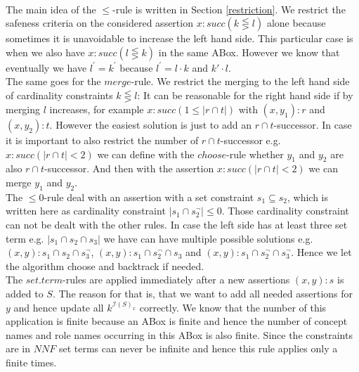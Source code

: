\documentclass[a4paper,11pt]{scrartcl}
\theoremstyle{break}
\theoremstyle{definition}
\begin{document}
\\
The main idea of the $\leq$-rule is written in Section \ref{restriction}. We restrict the safeness criteria on the considered assertion $x:succ(k\lesseqgtr l)$ alone because sometimes it is unavoidable to increase the left hand side. This particular case is when we also have $x:succ(l\lesseqgtr k)$ in the same ABox. However we know that eventually we have $l^\prime=k^\prime$ because $l^\prime=l\cdot k$ and $k\prime\cdot l$.\\
The same goes for the $merge$-rule. We restrict the merging to the left hand side of cardinality constraints $k\lesseqgtr l$: It can be reasonable for the right hand side if by merging $l$ increases, for example $x:succ(1\leq |r\cap t|)$ with $(x,y_1):r$ and $(x,y_2):t$. However the easiest solution is just to add an $r\cap t$-successor. In case it is important to also restrict the number of $r\cap t$-successor e.g. $x:succ(|r\cap t|<2)$ we can define with the $choose$-rule whether $y_1$ and $y_2$ are also $r\cap t$-successor. And then with the assertion $x:succ(|r\cap t|<2)$ we can merge $y_1$ and $y_2$.\\
The $\leq 0$-rule deal with an assertion with a set constraint $s_1\subseteq s_2$, which is written here as cardinality constraint $|s_1\cap s_2^\neg|\leq 0$. Those cardinality constraint can not be dealt with the other rules. In case the left side has at least three set term  e.g. $|s_1\cap s_2\cap s_3|$ we have can have multiple possible solutions e.g. $(x,y):s_1\cap s_2\cap s_3^\neg$, $(x,y):s_1\cap s_2^\neg\cap s_3$ and $(x,y):s_1\cap s_2^\neg\cap s_3^\neg$. Hence we let the algorithm choose and backtrack if needed.\\
The $set.term$-rules are applied immediately after a new assertions $(x,y):s$ is added to $S$. The reason for that is, that we want to add all needed assertions for $y$ and hence update all $k^{\mathcal{I}(S)_x}$ correctly. We know that the number of this application is finite because an ABox is finite and hence the number of concept names and role names occurring in this ABox is also finite. Since the constraints are in $NNF$ set terms can never be infinite and hence this rule applies only a finite times.
\end{document}
